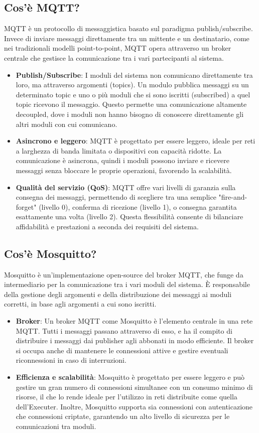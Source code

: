 \documentclass[target=bach,aauheader=,style=]{thud}
\begin{document}
\subsection{Cos'è MQTT?}
MQTT è un protocollo di messaggistica basato sul paradigma publish/subscribe. Invece di inviare messaggi direttamente tra un mittente e un destinatario, come nei tradizionali modelli point-to-point, MQTT opera attraverso un broker centrale che gestisce la comunicazione tra i vari partecipanti al sistema.
\begin{itemize}
  \item \textbf{Publish/Subscribe}: I moduli del sistema non comunicano direttamente tra loro, ma attraverso argomenti (topics). Un modulo pubblica messaggi su un determinato topic e uno o più moduli che si sono iscritti (subscribed) a quel topic ricevono il messaggio. Questo permette una comunicazione altamente decoupled, dove i moduli non hanno bisogno di conoscere direttamente gli altri moduli con cui comunicano.
  \item \textbf{Asincrono e leggero}: MQTT è progettato per essere leggero, ideale per reti a larghezza di banda limitata o dispositivi con capacità ridotte. La comunicazione è asincrona, quindi i moduli possono inviare e ricevere messaggi senza bloccare le proprie operazioni, favorendo la scalabilità.
  \item \textbf{Qualità del servizio (QoS)}: MQTT offre vari livelli di garanzia sulla consegna dei messaggi, permettendo di scegliere tra una semplice "fire-and-forget" (livello 0), conferma di ricezione (livello 1), o consegna garantita esattamente una volta (livello 2). Questa flessibilità consente di bilanciare affidabilità e prestazioni a seconda dei requisiti del sistema.
\end{itemize}

\subsection{Cos'è Mosquitto?}
Mosquitto è un'implementazione open-source del broker MQTT, che funge da intermediario per la comunicazione tra i vari moduli del sistema. È responsabile della gestione degli argomenti e della distribuzione dei messaggi ai moduli corretti, in base agli argomenti a cui sono iscritti.
\begin{itemize}
  \item \textbf{Broker}: Un broker MQTT come Mosquitto è l'elemento centrale in una rete MQTT. Tutti i messaggi passano attraverso di esso, e ha il compito di distribuire i messaggi dai publisher agli abbonati in modo efficiente. Il broker si occupa anche di mantenere le connessioni attive e gestire eventuali riconnessioni in caso di interruzioni.
  \item \textbf{Efficienza e scalabilità}: Mosquitto è progettato per essere leggero e può gestire un gran numero di connessioni simultanee con un consumo minimo di risorse, il che lo rende ideale per l'utilizzo in reti distribuite come quella dell'Executer. Inoltre, Mosquitto supporta sia connessioni con autenticazione che connessioni criptate, garantendo un alto livello di sicurezza per le comunicazioni tra moduli.
\end{itemize}
\end{document}
